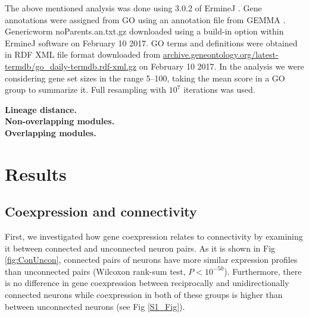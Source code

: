 \documentclass[10pt,letterpaper]{article}
\begin{document}
The above mentioned analysis was done using 3.0.2 of ErmineJ \cite{Gillis2010}.
Gene annotations were assigned from GO \cite{Ashburner2000} using an annotation file from GEMMA \cite{Zoubarev2012}.
Generic\textunderscore worm \textunderscore noParents.an.txt.gz downloaded using a build-in option within ErmineJ software on February 10 2017.
GO terms and definitions were obtained in RDF XML file format downloaded from \url{archive.geneontology.org/latest-termdb/go_daily-termdb.rdf-xml.gz} on February 10 2017.
In the analysis we were considering gene set sizes in the range 5–100, taking the mean score in a GO group to summarize it.
Full resampling with $10^{7}$ iterations was used.

\textbf{Lineage distance.}\\

\textbf{Non-overlapping modules.}\\

\textbf{Overlapping modules.}




\section*{Results}

\subsection*{Coexpression and connectivity}

First, we investigated how gene coexpression relates to connectivity by examining it between connected and unconnected neuron pairs.
As it is shown in Fig \ref{fig:ConUncon}, connected pairs of neurons have more similar expression profiles than unconnected pairs (Wilcoxon rank-sum test, $P < 10^{-50}$). Furthermore, there is no difference in gene coexpression between reciprocally and unidirectionally connected neurons while coexpression in both of these groups is higher than between unconnected neurons (see Fig \ref{S1_Fig}). \\
\end{document}
